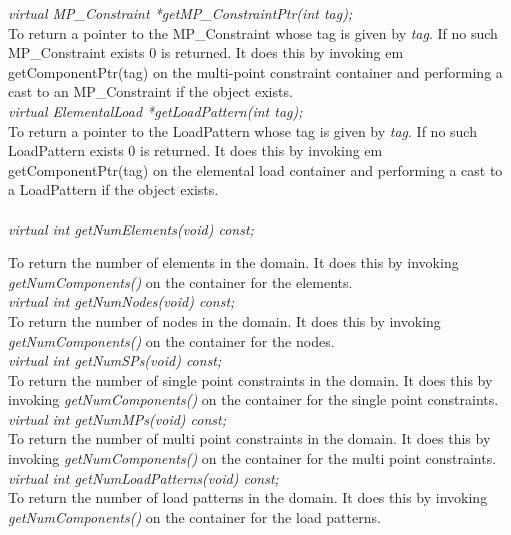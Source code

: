 {\em virtual  MP\_Constraint *getMP\_ConstraintPtr(int tag);}\\
To return a pointer to the MP\_Constraint whose tag is given by {\em tag}. If
no such MP\_Constraint exists $0$ is returned. It does this by invoking {em
getComponentPtr(tag)} on the multi-point constraint container and
performing a cast to an MP\_Constraint if the object exists. \\


{\em virtual  ElementalLoad *getLoadPattern(int tag);}\\
To return a pointer to the LoadPattern whose tag is given by {\em tag}. If
no such LoadPattern exists $0$ is returned. It does this by invoking {em
getComponentPtr(tag)} on the elemental load container and
performing a cast to a LoadPattern if the object exists. \\


 \\
{\em virtual int getNumElements(void) const;}

To return the number of elements in the domain. It does this by
invoking {\em getNumComponents()} on the container for the elements. \\

{\em virtual int getNumNodes(void) const;}\\
To return the number of nodes in the domain. It does this by
invoking {\em getNumComponents()} on the container for the
nodes. \\

{\em virtual int getNumSPs(void) const;}\\
To return the number of single point constraints in the domain. It
does this by invoking {\em getNumComponents()} on the container for
the single point constraints. \\

{\em virtual int getNumMPs(void) const;}\\
To return the number of multi point constraints in the domain. It
does this by invoking {\em getNumComponents()} on the container for
the multi point constraints. \\

{\em virtual int getNumLoadPatterns(void) const;}\\
To return the number of load patterns in the domain. It
does this by invoking {\em getNumComponents()} on the container for
the load patterns. \\

